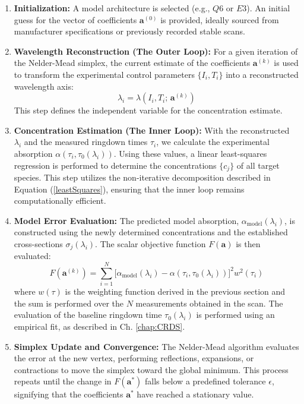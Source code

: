 \documentclass[12pt]{report}
\begin{document}
	\begin{enumerate}
		\item \textbf{Initialization:} 
		A model architecture is selected (e.g., $Q6$ or $E3$). An initial guess for the vector of coefficients $\mathbf{a}^{(0)}$ is provided, ideally sourced from manufacturer specifications or previously recorded stable scans.
		
		\item \textbf{Wavelength Reconstruction (The Outer Loop):} 
		For a given iteration of the Nelder-Mead simplex, the current estimate of the coefficients $\mathbf{a}^{(k)}$ is used to transform the experimental control parameters $\{I_i, T_i\}$ into a reconstructed wavelength axis:
		\begin{equation}
			\lambda_i = \lambda(I_i, T_i;\, \mathbf{a}^{(k)})
		\end{equation}
		This step defines the independent variable for the concentration estimate.
		
		\item \textbf{Concentration Estimation (The Inner Loop):} 
		With the reconstructed $\lambda_i$ and the measured ringdown times $\tau_i$, we calculate the experimental absorption $\alpha(\tau_i, \tau_0(\lambda_i))$. Using these values, a linear least-squares regression is performed to determine the concentrations $\{c_j\}$ of all target species. This step utilizes the non-iterative decomposition described in Equation (\ref{leastSquares}), ensuring that the inner loop remains computationally efficient.
		
		\item \textbf{Model Error Evaluation:} 
		The predicted model absorption, $\alpha_\mathrm{model}(\lambda_i)$, is constructed using the newly determined concentrations and the established cross-sections $\sigma_j(\lambda_i)$. The scalar objective function $F(\mathbf{a})$ is then evaluated:
		\begin{equation}
			F(\mathbf{a}^{(k)}) = \sum_{i=1}^{N} \Big[\alpha_\mathrm{model}(\lambda_i) - \alpha(\tau_i, \tau_0(\lambda_i))\Big]^2 w^2(\tau_i)
		\end{equation}
		where $w(\tau)$ is the weighting function derived in the previous section and the sum is performed over the $N$ measurements obtained in the scan. The evaluation of the baseline ringdown time $\tau_0(\lambda_i)$ is performed using an empirical fit, as described in Ch. \ref{chap:CRDS}.
		
		\item \textbf{Simplex Update and Convergence:} 
		The Nelder-Mead algorithm evaluates the error at the new vertex, performing reflections, expansions, or contractions to move the simplex toward the global minimum. This process repeats until the change in $F(\mathbf{a}^*)$ falls below a predefined tolerance $\epsilon$, signifying that the coefficients $\mathbf{a}^*$ have reached a stationary value.
		

\end{enumerate}
\end{document}
